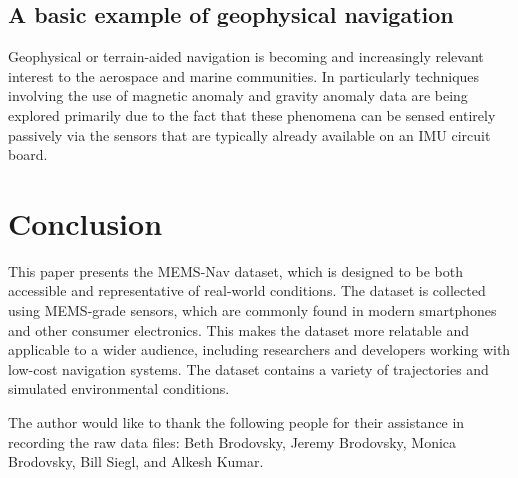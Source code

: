 \documentclass[sageh,times]{sagej}
\begin{document}
\subsection{A basic example of geophysical navigation}

Geophysical or terrain-aided navigation is becoming and increasingly relevant interest to the aerospace and marine communities. In particularly techniques involving the use of magnetic anomaly and gravity anomaly data are being explored primarily due to the fact that these phenomena can be sensed entirely passively via the sensors that are typically already available on an IMU circuit board.

\section{Conclusion}

This paper presents the MEMS-Nav dataset, which is designed to be both accessible and representative of real-world conditions. The dataset is collected using MEMS-grade sensors, which are commonly found in modern smartphones and other consumer electronics. This makes the dataset more relatable and applicable to a wider audience, including researchers and developers working with low-cost navigation systems. The dataset contains a variety of trajectories and simulated environmental conditions. 

\begin{acks}
The author would like to thank the following people for their assistance in recording the raw data files: Beth Brodovsky, Jeremy Brodovsky, Monica Brodovsky, Bill Siegl, and Alkesh Kumar.
\end{acks}




\end{document}
